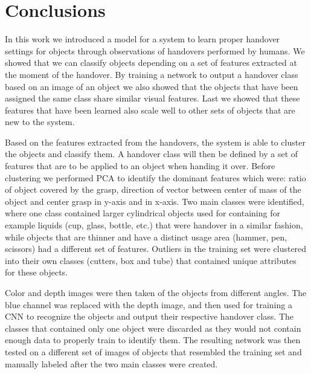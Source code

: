\section{Conclusions}

In this work we introduced a model for a system to learn proper handover settings for objects through observations of handovers performed by humans. We showed that we can classify objects depending on a set of features extracted at the moment of the handover. By training a network to output a handover class based on an image of an object we also showed that the objects that have been assigned the same class share similar visual features. Last we showed that these features that have been learned also scale well to other sets of objects that are new to the system.

Based on the features extracted from the handovers, the system is able to cluster the objects and classify them. A handover class will then be defined by a set of features that are to be applied to an object when handing it over. Before clustering we performed PCA to identify the dominant features which were: ratio of object covered by the grasp, direction of vector between center of mass of the object and center grasp in y-axis and in x-axis. Two main classes were identified, where one class contained larger cylindrical objects used for containing for example liquids (cup, glass, bottle, etc.) that were handover in a similar fashion, while objects that are thinner and have a distinct usage area (hammer, pen, scissors) had a different set of features. Outliers in the training set were clustered into their own classes (cutters, box and tube) that contained unique attributes for these objects.

Color and depth images were then taken of the objects from different angles. The blue channel was replaced with the depth image, and then used for training a CNN to recognize the objects and output their respective handover class. The classes that contained only one object were discarded as they would not contain enough data to properly train to identify them. The resulting network was then tested on a different set of images of objects that resembled the training set and manually labeled after the two main classes were created.

